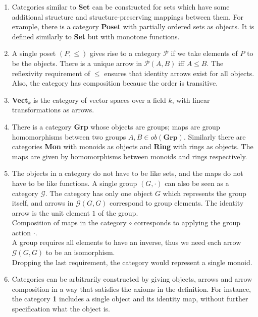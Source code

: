 \begin {enumerate}
  \item Categories similar to \textbf{Set} can be constructed for sets which have some additional structure and structure-preserving mappings between them. For example, there is a category \textbf{Poset} with partially ordered sets as objects. It is defined similarly to \textbf{Set} but with monotone functions. 
  
  \item A single poset $(P, \leq)$ gives rise to a category $\mathscr{P}$ if we take elements of $P$ to be the objects. There is a unique arrow in $\mathscr{P}(A, B)$ iff $A \leq B$. The reflexivity requirement of $\leq$ ensures that identity arrows exist for all objects. Also, the category has composition because the order is transitive.
  
  \item \textbf{Vect$_k$} is the category of vector spaces over a field $k$, with linear transformations as arrows.
  
  \item There is a category \textbf{Grp} whose objects are groups; maps are group homomorphisms between two groups $A,B \in ob(\textbf{Grp}).$
    Similarly there are categories \textbf{Mon} with monoids as objects and \textbf{Ring} with rings as objects.
    The maps are given by homomorphisms between monoids and rings respectively.
  
  \item
    The objects in a category do not have to be like sets, and the maps do not have to be like functions.
    A single group $(G, \cdot)$ can also be seen as a category $\mathcal{G}$. The category has only one object $G$ which represents the group itself,
    and arrows in $\mathcal{G}(G, G)$  correspond to group elements.
    The identity arrow is the unit element $1$ of the group.\\
    Composition of maps in the category $\circ$ corresponds to applying the group action $\cdot$.\\
    A group requires all elements to have an inverse, thus we need each arrow $\mathcal{G}(G, G)$ to be an isomorphism.\\
    Dropping the last requirement, the category would represent a single monoid.

  
  \item Categories can be arbitrarily constructed by giving objects, arrows and arrow composition in a way that satisfies the axioms in the definition. For instance, the category \textbf{1} includes a single object and its identity map, without further specification what the object is. \\

 \end {enumerate}


